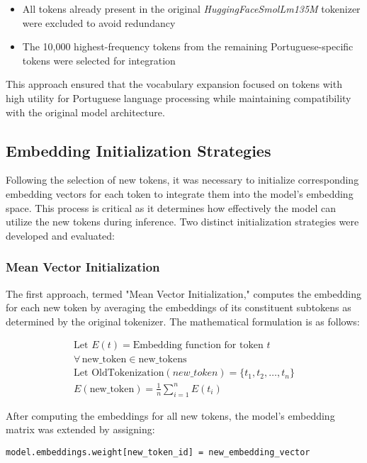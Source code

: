 \begin{itemize}
    \item All tokens already present in the original \textit{HuggingFaceSmolLm135M} tokenizer were excluded to avoid redundancy
    \item The 10,000 highest-frequency tokens from the remaining Portuguese-specific tokens were selected for integration
\end{itemize}

This approach ensured that the vocabulary expansion focused on tokens with high utility for Portuguese language processing while maintaining compatibility with the original model architecture.

\subsection{Embedding Initialization Strategies}
Following the selection of new tokens, it was necessary to initialize corresponding embedding vectors for each token to integrate them into the model's embedding space. This process is critical as it determines how effectively the model can utilize the new tokens during inference. Two distinct initialization strategies were developed and evaluated:

\subsubsection{Mean Vector Initialization}
The first approach, termed "Mean Vector Initialization," computes the embedding for each new token by averaging the embeddings of its constituent subtokens as determined by the original tokenizer. The mathematical formulation is as follows:

$$
\begin{array}{c}
    \text{Let } E(t) = \text{Embedding function for token } t \\
    \forall\, \text{new\_token} \in \text{new\_tokens} \\
    \text{Let } \text{OldTokenization}(new\_token) = \{t_1, t_2, \ldots, t_n\} \\
    E(\text{new\_token}) = \frac{1}{n} \sum_{i=1}^{n} E(t_i)
\end{array}
$$

After computing the embeddings for all new tokens, the model's embedding matrix was extended by assigning:

\begin{verbatim}
model.embeddings.weight[new_token_id] = new_embedding_vector
\end{verbatim}

